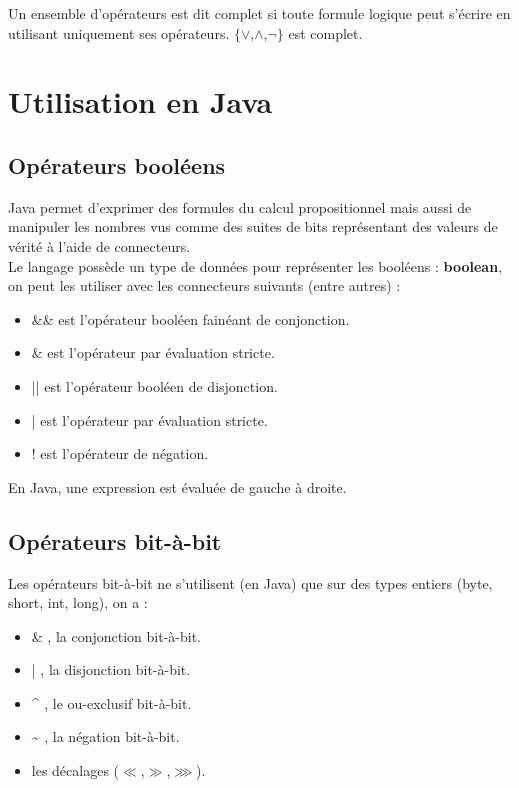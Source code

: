 \documentclass[a4paper,10pt]{book}
\begin{document}
Un ensemble d’opérateurs est dit complet si toute formule logique peut s’écrire en utilisant uniquement ses opérateurs. $\{\vee$,$\wedge$,$\neg\}$ est complet.

\newpage
\section{Utilisation en Java}
\subsection{Opérateurs booléens}
Java permet d’exprimer des formules du calcul propositionnel mais aussi de manipuler les nombres vus comme des suites de bits représentant des valeurs de vérité à l’aide de connecteurs.\\

Le langage possède un type de données pour représenter les booléens : \textbf{boolean}, on peut les utiliser avec les connecteurs suivants (entre autres) :\\ \begin{itemize}\renewcommand{\labelitemi}{$\bullet$}
\item \&\& est l’opérateur booléen fainéant de conjonction.
\item \& est l’opérateur par évaluation stricte.
\item || est l’opérateur booléen de disjonction.
\item | est l’opérateur par évaluation stricte.
\item ! est l’opérateur de négation.\\ \end{itemize}

En Java, une expression est évaluée de gauche à droite.\\

\subsection{Opérateurs bit-à-bit}
Les opérateurs bit-à-bit ne s’utilisent (en Java) que sur des types entiers (byte, short, int, long), on a :\begin{itemize}\renewcommand{\labelitemi}{$\bullet$}
\item \& , la conjonction bit-à-bit.
\item | , la disjonction bit-à-bit.
\item \^{} , le ou-exclusif bit-à-bit.
\item \~{} , la négation bit-à-bit.
\item les décalages ($\ll$,$\gg$,$\ggg$). \end{itemize}
\end{document}
